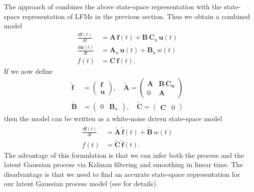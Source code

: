 \documentclass[journal]{IEEEtran}
\begin{document}
The approach of \cite{Hartikainen+Sarkka:2011,Hartikainen+Seppanen+Sarkka:2012} combines the above state-space representation with the state-space representation of LFMs in the previous section. Thus we obtain a combined model
%
\begin{equation}
\begin{split}
  \frac{d\mathbf{f}(t)}{dt}
  &= \mathbf{A} \, \mathbf{f}(t)
  + \mathbf{B} \, \mathbf{C}_u \, \mathbf{u}(t) \\
  \frac{d\mathbf{u}(t)}{dt}
  &= \mathbf{A}_u \, \mathbf{u}(t) + \mathbf{B}_u \, w(t) \\
  f(t) &= \mathbf{C} \, \mathbf{f}(t).
\end{split}
\end{equation}
%
If we now define
%
\begin{equation}
\begin{split}
  \tilde{\mathbf{f}} &= \begin{pmatrix}
	\mathbf{f} \\ \mathbf{u}
  \end{pmatrix}, \quad
  \tilde{\mathbf{A}}
  = \begin{pmatrix}
	\mathbf{A} & \mathbf{\mathbf{B} \, \mathbf{C}_u} \\
	0 & \mathbf{A}
  \end{pmatrix} \\
  \tilde{\mathbf{B}}
  &= \begin{pmatrix}
	0 & \mathbf{B}_u
  \end{pmatrix}, \quad
  \tilde{\mathbf{C}}
  = \begin{pmatrix}
	\mathbf{C} & 0
  \end{pmatrix}
\end{split}
\end{equation}
%
then the model can be written as a white-noise driven state-space model
%
\begin{equation}
\begin{split}
  \frac{d\tilde{\mathbf{f}}(t)}{dt}
  &= \tilde{\mathbf{A}} \, \tilde{\mathbf{f}}(t)
  + \tilde{\mathbf{B}} \, w(t) \\
  f(t) &= \tilde{\mathbf{C}} \, \tilde{\mathbf{f}}(t).
\end{split}
\label{eq:ssaug}
\end{equation}
%
The advantage of this formulation is that we can infer both the process and the latent Gaussian process via Kalman filtering and smoothing in linear time. The disadvantage is that we need to find an accurate state-space representation for our latent Gaussian process model (see \cite{Hartikainen+Sarkka:2010,Sarkka+Solin+Hartikainen:2013} for details).
\end{document}
